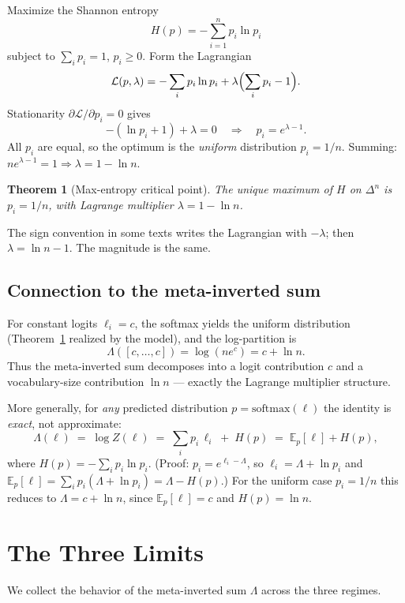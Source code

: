 \documentclass[11pt]{article}
\newtheorem{theorem}{Theorem}[section]
\newcommand{\simplex}[1]{\Delta^{#1}}
\newcommand{\softmax}{\mathrm{softmax}}
\begin{document}
Maximize the Shannon entropy
\[
H(p) = -\sum_{i=1}^n p_i \ln p_i
\]
subject to $\sum_i p_i = 1$, $p_i\ge 0$. Form the Lagrangian
\[
\mathcal{L}(p,\lambda) = -\sum_i p_i\ln p_i + \lambda\Bigl(\sum_i p_i - 1\Bigr).
\]
Stationarity $\partial\mathcal{L}/\partial p_i = 0$ gives
\[
-(\ln p_i + 1) + \lambda = 0
\quad\Longrightarrow\quad
p_i = e^{\lambda - 1}.
\]
All $p_i$ are equal, so the optimum is the \emph{uniform} distribution
$p_i = 1/n$. Summing: $n e^{\lambda-1} = 1 \Rightarrow \lambda = 1 - \ln n$.

\begin{theorem}[Max-entropy critical point]
\label{thm:maxent}
The unique maximum of $H$ on $\simplex{n}$ is $p_i = 1/n$, with Lagrange
multiplier $\lambda = 1 - \ln n$.
\end{theorem}

\noindent The sign convention in some texts writes the Lagrangian with
$-\lambda$; then $\lambda = \ln n - 1$. The magnitude is the same.

\subsection{Connection to the meta-inverted sum}
\label{sec:maxent-meta}

For constant logits $\ell_i = c$, the softmax yields the uniform distribution
(Theorem~\ref{thm:maxent} realized by the model), and the log-partition is
\[
\Lambda([c,\dots,c]) = \log(ne^c) = c + \ln n.
\]
Thus the meta-inverted sum decomposes into a logit contribution $c$ and a
vocabulary-size contribution $\ln n$ --- exactly the Lagrange multiplier
structure.

More generally, for \emph{any} predicted distribution $p=\softmax(\ell)$ the
identity is \emph{exact}, not approximate:
\[
\Lambda(\ell) \;=\; \log Z(\ell)
\;=\; \sum_i p_i\,\ell_i \;+\; H(p)
\;=\; \mathbb{E}_{p}[\ell] + H(p),
\]
where $H(p)=-\sum_i p_i\ln p_i$.  (Proof: $p_i=e^{\ell_i-\Lambda}$, so
$\ell_i=\Lambda+\ln p_i$ and $\mathbb{E}_p[\ell]=\sum_i p_i(\Lambda+\ln p_i)
=\Lambda - H(p)$.)  For the uniform case $p_i=1/n$ this reduces to
$\Lambda = c + \ln n$, since $\mathbb{E}_p[\ell]=c$ and $H(p)=\ln n$.

\section{The Three Limits}
\label{sec:limits}

We collect the behavior of the meta-inverted sum $\Lambda$ across the three
regimes.
\end{document}
